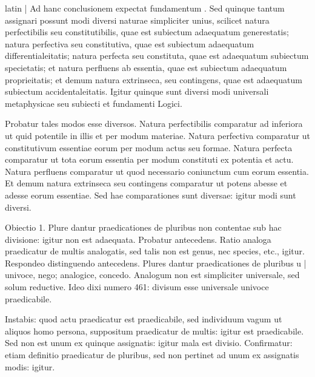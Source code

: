 \begin{otherlanguage*}{latin}
\pstart
  \textnormal{|} Ad hanc conclusionem expectat fundamentum  . Sed quinque tantum assignari possunt modi diversi naturae simpliciter unius, scilicet natura perfectibilis seu constitutibilis, quae est subiectum adaequatum generestatis; natura perfectiva seu constitutiva, quae est subiectum adaequatum differentialeitatis; natura perfecta seu constituta, quae est adaequatum subiectum specietatis; et natura perfluens ab essentia, quae est subiectum adaequatum proprieitatis; et demum natura extrinseca, seu contingens, quae est adaequatum subiectum accidentaleitatis. Igitur quinque sunt diversi modi universali metaphysicae seu subiecti et fundamenti Logici. 
\pend

\pstart
  Probatur tales modos esse diversos. Natura perfectibilis comparatur ad inferiora ut quid potentile in illis et per modum materiae. Natura perfectiva comparatur ut constitutivum essentiae eorum per modum actus seu formae. Natura perfecta comparatur ut tota eorum essentia per modum constituti ex potentia et actu. Natura perfluens comparatur ut quod necessario coniunctum cum eorum essentia. Et demum natura extrinseca seu contingens comparatur ut potens abesse et adesse eorum essentiae. Sed hae comparationes sunt diversae: igitur modi sunt diversi. 
\pend

\pstart
  Obiectio 1. Plure dantur praedicationes de pluribus non contentae sub hac divisione: igitur non est adaequata. Probatur antecedens. Ratio analoga praedicatur de multis analogatis, sed talis non est genus, nec species, etc., igitur. Respondeo distinguendo antecedens. Plures dantur praedicationes de pluribus u \textnormal{|}    univoce, nego; analogice, concedo. Analogum non est simpliciter universale, sed solum reductive. Ideo dixi numero 461: divisum esse universale univoce praedicabile. 
\pend

\pstart
  Instabis: quod actu praedicatur est praedicabile, sed individuum vagum ut aliquos homo persona, suppositum praedicatur de multis: igitur est praedicabile. Sed non est unum ex quinque assignatis: igitur mala est divisio. Confirmatur: etiam definitio praedicatur de pluribus, sed non pertinet ad unum ex assignatis modis: igitur. 
\pend


\end{otherlanguage*}
